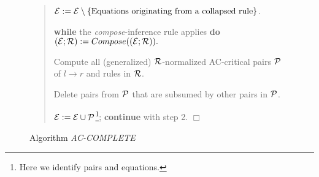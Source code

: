 \begin{figure}[ht]
\begin{center}
{\begin{minipage}{5.5in}
\begin{quote}
\begin{description}
    \( {\cal E} := {\cal E} \setminus \{ \mbox{Equations originating from a
    collapsed rule} \} \).
 \item[{(9) [Compose.]}] {\bf while} the {\em compose}-inference rule
   applies {\bf do} \\
   \( ({\cal E};{\cal R}) := Compose(({\cal E};{\cal R})). \)
 \item[{(10) [Deduce.]}] Compute all (generalized) $\cal R$-normalized
      AC-critical pairs ${\cal P}$ of     $l \rightarrow r$ and rules
    in $\cal R$. 
 \item[{(11) [Subsumption test.]}] Delete pairs from $\cal P$ that are
      subsumed by other pairs in $\cal P$.
 \item[{(12) [Update $\cal E$.]}]
        \( {\cal E} := {\cal E} \cup {\cal P} \)\footnote{Here we
                                             identify pairs and equations.};
     {\bf continue} with step 2. \hfill $\Box$
\end{description}
\end{quote}
\end{minipage}
}
\end{center}
\caption{Algorithm {\em AC-COMPLETE}} \label{fi:accmpl}
\end{figure}
